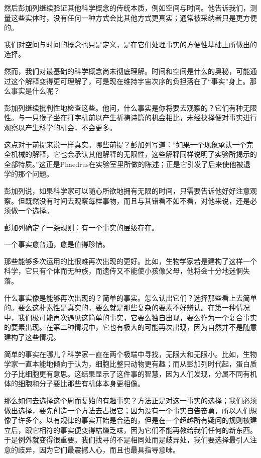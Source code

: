 \documentclass[UTF8]{article}
\begin{document}
\par 然后彭加列继续验证其他科学概念的传统本质，例如空间与时间。他告诉我们，测量这些实体时，没有任何一种方式会比其他方式更真实；通常被采纳者只是更方便的。
\par 我们对空间与时间的概念也只是定义，是在它们处理事实的方便性基础上所做出的选择。
\par 然而，我们对最基础的科学概念尚未彻底理解。时间和空间是什么的奥秘，可能通过这个解释变得更可理解了，可是现在维持宇宙次序的负担落在了“事实”身上。那么事实是什么呢？
\par 彭加列继续批判性地检查这些。他问，什么事实是你将要去观察的？它们有种无限性。与一只猴子坐在打字机前以产生祈祷诗篇的机会相比，未经抉择便对事实进行观察以产生科学的机会，不会更多。
\par 这点对于前提来说一样真实。哪些前提？彭加列写道：“如果一个现象承认一个完全机械的解释，它也会承认其他解释的无限性，这些解释同样说明了实验所揭示的全部特质。”这正是Phaedrus在实验室里所做的陈述；正是它引发了后来使他被退学的那个问题。
\par 彭加列说，如果科学家可以随心所欲地拥有无限的时间，只需要告诉他好好注意观察。但既然没有时间去观察每样事物，而且与其错看不如不看，对他来说，还是必须做一个选择。
\par 彭加列确定了一条规则：有一个事实的层级存在。
\par 一个事实愈普通，愈是值得珍惜。
\par 那些能够多次运用的比很难再次出现的更好。比如，生物学家若是建构了这样一个科学，它只有个体而无种族，而遗传又不能使小孩像父母，他将会十分地迷惘失落。
\par 什么事实像是能够再次出现的？简单的事实。怎么认出它们？选择那些看上去简单的。要么这朴素性是真实的，要么就是那些复杂的要素不好辨认。在第一种情况中，我们极可能再次遇见这简单的事实，它要么独自出现，要么作为一个复合事实的要素出现。在第二种情况中，它也有极大的可能再次出现，因为自然并不是随意建构了这些情况。
\par 简单的事实在哪儿？科学家一直在两个极端中寻找，无限大和无限小。比如，生物学家一直本能地倾向于认为，细胞比整只动物更有趣；而从彭加列时代起，蛋白质分子比细胞更有意思。这结果显示了这件事的智慧，因为人们发现，分属不同有机体的细胞和分子要比那些有机体本身更相像。
\par 那么如何去选择这个周而复始的有趣事实？方法正是对这一事实的选择；我们必须做出选择，要先创造一个方法去占据它；因为没有一个事实自告奋勇，所以人们想像了许多个。以有规律的事实开始是合适的，但是在一个超越所有疑问的规则被建立后，跟它相符的事实便变得枯燥乏味，因为它们不能再教给我们任何的新东西。于是例外就变得很重要。我们找寻的不是相同处而是歧异处，我们要选择最引人注意的歧异，因为它们最震撼人心，而且也最具指导意味。
\end{document}
